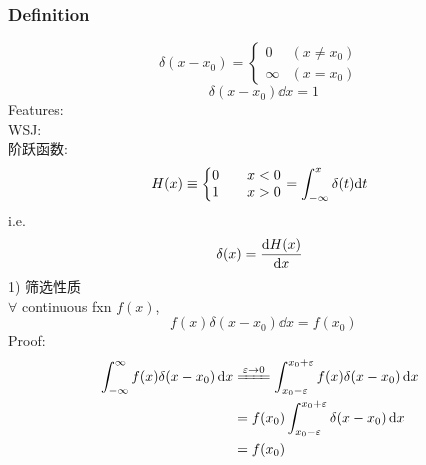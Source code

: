 \documentclass[UTF8]{ctexart} %
\DeclareMathOperator{\intdinf}{\int_{-\infty}^\infty}
\numberwithin{equation}{section}
\begin{document}
\subsubsection{Definition}
\begin{equation}\label{key}
\delta(x-x_0)=\left\{
	\begin{array}{lr}
	0 & (x\neq x_0)\\
	\infty & (x=x_0)
	\end{array}
\right.
\end{equation}
\begin{equation}\label{key}
\intdinf\delta(x-x_0)\dd{x}=1
\end{equation}
Features:\\
WSJ:\\
阶跃函数:
\begin{equation}\label{key}
H(x) \equiv \left\{\mqty{0 &\quad x<0\\
						 1 &\quad x>0}\right.
	=\int_{-\infty}^x \delta(t)\dd t
\end{equation}
i.e. 
\begin{equation}\label{key}
\delta(x) = \dv{H(x)}{x}
\end{equation}
1) 筛选性质\\
$\forall$ continuous fxn $f(x)$,
\begin{equation}\label{key}
\intdinf f(x)\delta(x-x_0)\dd{x}=f(x_0)
\end{equation}
Proof:\\
\begin{equation}\label{key}
\begin{aligned}
\intdinf f(x)\delta(x-x_0)\dd{x}
&\xlongequal{\varepsilon\rightarrow 0}
\int_{x_0-\varepsilon}^{x_0+\varepsilon}f(x)\delta(x-x_0)\dd{x}\\
&=f(x_0)\int_{x_0-\varepsilon}^{x_0+\varepsilon}\delta(x-x_0)\dd{x}\\
&=f(x_0)
\end{aligned}
\end{equation}
\end{document}
